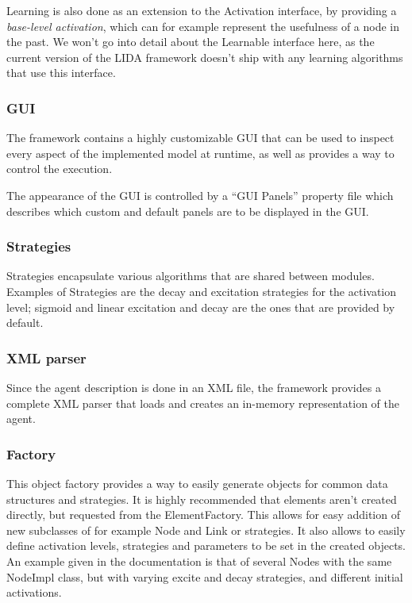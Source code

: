 Learning is also done as an extension to the Activation interface, by providing a {\em base-level activation}, which can for example represent the usefulness of a node in the past. We won't go into detail about the Learnable interface here, as the current version of the LIDA framework doesn't ship with any learning algorithms that use this interface.

\subsubsection{GUI}
The framework contains a highly customizable GUI that can be used to inspect every aspect of the implemented model at runtime, as well as provides a way to control the execution.

The appearance of the GUI is controlled by a ``GUI Panels'' property file which describes which custom and default panels are to be displayed in the GUI.

\subsubsection{Strategies}
Strategies encapsulate various algorithms that are shared between modules. Examples of Strategies are the decay and excitation strategies for the activation level; sigmoid and linear excitation and decay are the ones that are provided by default.

\subsubsection{XML parser}
Since the agent description is done in an XML file, the framework provides a complete XML parser that loads and creates an in-memory representation of the agent.

\subsubsection{Factory}
This object factory provides a way to easily generate objects for common data structures and strategies. It is highly recommended that elements aren't created directly, but requested from the ElementFactory. This allows for easy addition of new subclasses of for example Node and Link or strategies. It also allows to easily define activation levels, strategies and parameters to be set in the created objects. An example given in the documentation\cite{snaider2012lida} is that of several Nodes with the same NodeImpl class, but with varying excite and decay strategies, and different initial activations.

